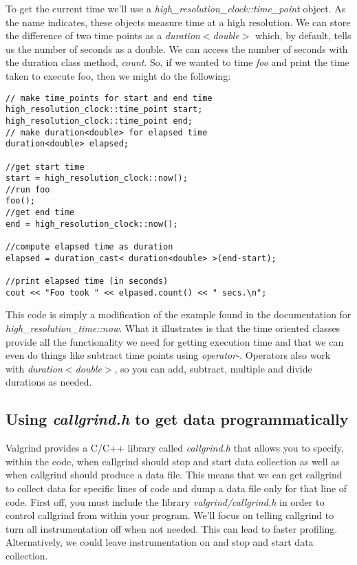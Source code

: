 \documentclass[]{tufte-handout}
\begin{document}
To get the current time we'll use a \textit{high\_resolution\_clock::time\_point} object. As the name indicates, these objects measure time at a high resolution. We can store the difference of two time points as a \textit{duration$<$double$>$} which, by default, tells us the number of seconds as a double. We can access the number of seconds with the duration class method, \textit{count}. So, if we wanted to time \textit{foo} and print the time taken to execute foo, then we might do the following:
\begin{verbatim}
// make time_points for start and end time
high_resolution_clock::time_point start;
high_resolution_clock::time_point end;
// make duration<double> for elapsed time
duration<double> elapsed;

//get start time
start = high_resolution_clock::now();
//run foo
foo();
//get end time
end = high_resolution_clock::now();

//compute elapsed time as duration
elapsed = duration_cast< duration<double> >(end-start);

//print elapsed time (in seconds)
cout << "Foo took " << elpased.count() << " secs.\n";
\end{verbatim}
This code is simply a modification of the example found in the documentation for \textit{high\_resolution\_time::now}. What it illustrates is that the time oriented classes provide all the functionality we need for getting execution time and that we can even do things like subtract time points using \textit{operator-}.  Operators also work with \textit{duration$<$double$>$}, so you can add, subtract, multiple and divide durations as needed.


\subsection{Using \textit{callgrind.h} to get data programmatically}

Valgrind provides a C/C++ library called \textit{callgrind.h} that allows you to specify, within the code, when callgrind should stop and start data collection as well as when callgrind should produce a data file. This means that we can get callgrind to collect data for specific lines of code and dump a data file only for that line of code. First off, you must include the library \textit{valgrind/callgrind.h} in order to control callgrind from within your program. We'll focus on telling callgrind to turn all instrumentation off when not needed. This  can lead to faster profiling. Alternatively, we could leave instrumentation on and stop and start data collection.
\end{document}
